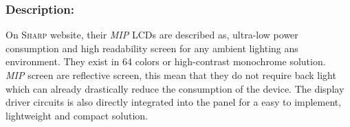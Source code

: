 \documentclass[report.tex]{subfiles}
\begin{document}
\subsubsection{Description:}


On \textsc{Sharp} website\cite{SHARPMIP}, their \textit{MIP} LCDs are described as, ultra-low power consumption and high readability screen for any ambient lighting ans environment. They exist in 64 colors or high-contrast monochrome solution.\\

\textit{MIP} screen are reflective screen, this mean that they do not require back light which can already drastically reduce the consumption of the device. The display driver circuits is also directly integrated into the panel for a easy to implement, lightweight and compact solution.\\
\end{document}
